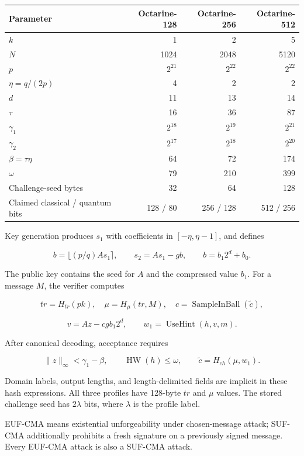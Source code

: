 \documentclass[
  american,
  10pt,
  a4paper,
]{article}
\newcounter{none} %
\begin{document}
{\def\LTcaptype{none} %
\begin{longtable}[]{@{}lrrr@{}}
\toprule\noalign{}
Parameter & Octarine-128 & Octarine-256 & Octarine-512 \\
\midrule\noalign{}
\endhead
\bottomrule\noalign{}
\endlastfoot
\(k\) & 1 & 2 & 5 \\
\(N\) & 1024 & 2048 & 5120 \\
\(p\) & \(2^{21}\) & \(2^{22}\) & \(2^{22}\) \\
\(\eta=q/(2p)\) & 4 & 2 & 2 \\
\(d\) & 11 & 13 & 14 \\
\(\tau\) & 16 & 36 & 87 \\
\(\gamma_1\) & \(2^{18}\) & \(2^{19}\) & \(2^{21}\) \\
\(\gamma_2\) & \(2^{17}\) & \(2^{18}\) & \(2^{20}\) \\
\(\beta=\tau\eta\) & 64 & 72 & 174 \\
\(\omega\) & 79 & 210 & 399 \\
Challenge-seed bytes & 32 & 64 & 128 \\
Claimed classical / quantum bits & 128 / 80 & 256 / 128 & 512 / 256 \\
\end{longtable}
}

Key generation produces \(s_1\) with coefficients in \([-\eta,\eta-1]\),
and defines

\[
b=\lfloor(p/q)As_1\rceil,\qquad
s_2=As_1-gb,\qquad b=b_1 2^d+b_0.
\]

The public key contains the seed for \(A\) and the compressed value
\(b_1\). For a message \(M\), the verifier computes

\[
tr=H_{tr}(pk),\quad \mu=H_\mu(tr,M),\quad
c=\operatorname{SampleInBall}(\widetilde c),
\]

\[
v=Az-cgb_1 2^d,\qquad
w_1=\operatorname{UseHint}(h,v,m).
\]

After canonical decoding, acceptance requires

\[
\|z\|_\infty<\gamma_1-\beta,\qquad
\operatorname{HW}(h)\leq\omega,\qquad
\widetilde c=H_{ch}(\mu,w_1).
\]

Domain labels, output lengths, and length-delimited fields are implicit
in these hash expressions. All three profiles have 128-byte \(tr\) and
\(\mu\) values. The stored challenge seed has \(2\lambda\) bits, where
\(\lambda\) is the profile label.

EUF-CMA means existential unforgeability under chosen-message attack;
SUF-CMA additionally prohibits a fresh signature on a previously signed
message. Every EUF-CMA attack is also a SUF-CMA attack.
\end{document}
